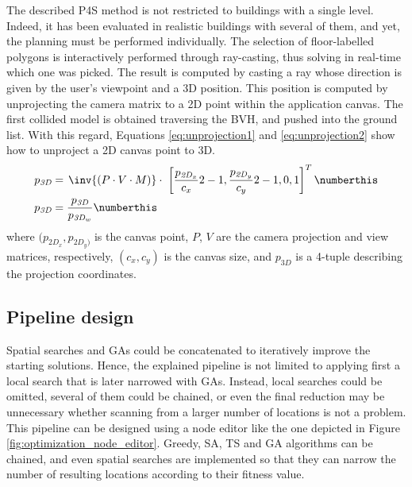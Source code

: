 The described P4S method is not restricted to buildings with a single level. Indeed, it has been evaluated in realistic buildings with several of them, and yet, the planning must be performed individually. The selection of floor-labelled polygons is interactively performed through ray-casting, thus solving in real-time which one was picked. The result is computed by casting a ray whose direction is given by the user's viewpoint and a 3D position. This position is computed by unprojecting the camera matrix to a 2D point within the application canvas. The first collided model is obtained traversing the BVH, and pushed into the ground list. With this regard, Equations \ref{eq:unprojection1} and \ref{eq:unprojection2} show how to unproject a 2D canvas point to 3D.
\begin{align*}
    p_{\textit{3D}} &= \hspace{.5mm} \inv{\left(P \cdot V \cdot M\right)} \cdot \hspace{1mm} \left[\frac{p_{\mathit{2D}_x}}{c_x}2 - 1,  \frac{p_{\mathit{2D}_y}}{c_y}2 - 1, 0, 1\right]^T
    \numberthis \label{eq:unprojection1}\\
    p_{\textit{3D}} &= \frac{p_{\textit{3D}}}{p_{\textit{3D}_w}}
    \numberthis \label{eq:unprojection2}
\end{align*}
where $(p_{\textit{2D}_x}, p_{\textit{2D}_y)}$ is the canvas point, $P$, $V$ are the camera projection and view matrices, respectively, $(c_x, c_y)$ is the canvas size, and $p_{\textit{3D}}$ is a 4-tuple describing the projection coordinates.

\subsection{Pipeline design}

Spatial searches and GAs could be concatenated to iteratively improve the starting solutions. Hence, the explained pipeline is not limited to applying first a local search that is later narrowed with GAs. Instead, local searches could be omitted, several of them could be chained, or even the final reduction may be unnecessary whether scanning from a larger number of locations is not a problem. This pipeline can be designed using a node editor like the one depicted in Figure \ref{fig:optimization_node_editor}. Greedy, SA, TS and GA algorithms can be chained, and even spatial searches are implemented so that they can narrow the number of resulting locations according to their fitness value.

